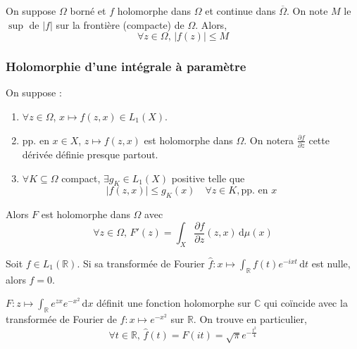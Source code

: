   \begin{theorem}
    On suppose $\Omega$ borné et $f$ holomorphe dans $\Omega$ et continue dans $\overline{\Omega}$. On note $M$ le $\sup$ de $\vert f \vert$ sur la frontière (compacte) de $\Omega$. Alors,
    \[ \forall z \in \Omega, \, \vert f(z) \vert \leq M \]
  \end{theorem}

  \subsubsection{Holomorphie d'une intégrale à paramètre}


  \begin{theorem}
    On suppose :
    \begin{enumerate}[label={\bfseries(\roman*)}]
      \item $\forall z \in \Omega$, $x \mapsto f(z,x) \in L_1(X)$.
      \item pp. en $x \in X$, $z \mapsto f(z,x)$ est holomorphe dans $\Omega$. On notera $\frac{\partial f}{\partial z}$ cette dérivée définie presque partout.
      \item $\forall K \subseteq \Omega$ compact, $\exists g_K \in L_1(X)$ positive telle que
      \[ \left| f(z,x) \right| \leq g_K(x) \quad \forall z \in K, \text{pp. en } x \]
    \end{enumerate}
    Alors $F$ est holomorphe dans $\Omega$ avec
    \[ \forall z \in \Omega, \, F'(z) = \int_X \frac{\partial f}{\partial z}(z, x) \, \mathrm{d}\mu(x) \]
  \end{theorem}


  \begin{application}
    Soit $f \in L_1(\mathbb{R})$. Si sa transformée de Fourier $\widehat{f} : x \mapsto \int_{\mathbb{R}} f(t) e^{-ixt} \, \mathrm{d}t$ est nulle, alors $f = 0$.
  \end{application}


  \begin{application}
    $F : z \mapsto \int_{\mathbb{R}} e^{zx} e^{-x^2} \, \mathrm{d}x$ définit une fonction holomorphe sur $\mathbb{C}$ qui coïncide avec la transformée de Fourier de $f : x \mapsto e^{-x^2}$ sur $\mathbb{R}$. On trouve en particulier,
    \[ \forall t \in \mathbb{R}, \, \widehat{f}(t) = F(it) = \sqrt{\pi} e^{-\frac{t^2}{4}} \]
  \end{application}

